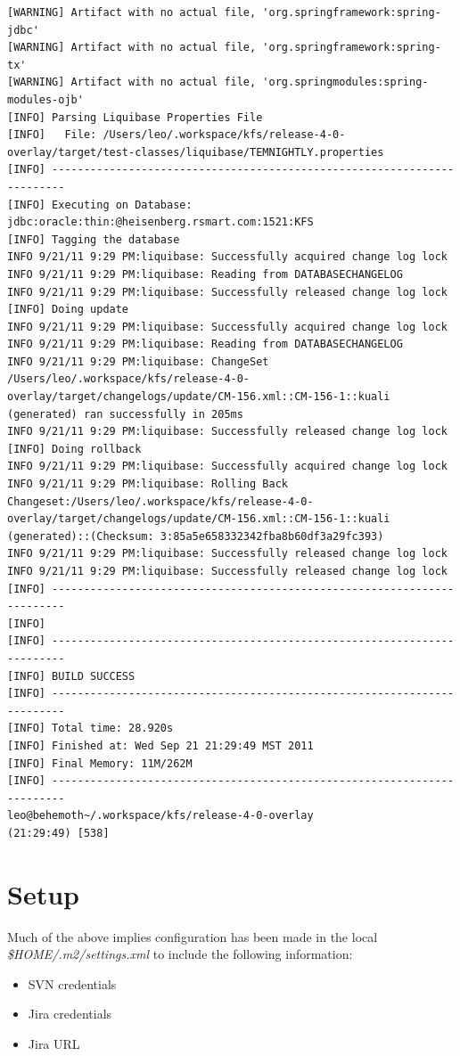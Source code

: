 \documentclass[12pt,notitlepage]{article}
\begin{document}
\begin{lstlisting}
[WARNING] Artifact with no actual file, 'org.springframework:spring-jdbc'
[WARNING] Artifact with no actual file, 'org.springframework:spring-tx'
[WARNING] Artifact with no actual file, 'org.springmodules:spring-modules-ojb'
[INFO] Parsing Liquibase Properties File
[INFO]   File: /Users/leo/.workspace/kfs/release-4-0-overlay/target/test-classes/liquibase/TEMNIGHTLY.properties
[INFO] ------------------------------------------------------------------------
[INFO] Executing on Database: jdbc:oracle:thin:@heisenberg.rsmart.com:1521:KFS
[INFO] Tagging the database
INFO 9/21/11 9:29 PM:liquibase: Successfully acquired change log lock
INFO 9/21/11 9:29 PM:liquibase: Reading from DATABASECHANGELOG
INFO 9/21/11 9:29 PM:liquibase: Successfully released change log lock
[INFO] Doing update
INFO 9/21/11 9:29 PM:liquibase: Successfully acquired change log lock
INFO 9/21/11 9:29 PM:liquibase: Reading from DATABASECHANGELOG
INFO 9/21/11 9:29 PM:liquibase: ChangeSet /Users/leo/.workspace/kfs/release-4-0-overlay/target/changelogs/update/CM-156.xml::CM-156-1::kuali (generated) ran successfully in 205ms
INFO 9/21/11 9:29 PM:liquibase: Successfully released change log lock
[INFO] Doing rollback
INFO 9/21/11 9:29 PM:liquibase: Successfully acquired change log lock
INFO 9/21/11 9:29 PM:liquibase: Rolling Back Changeset:/Users/leo/.workspace/kfs/release-4-0-overlay/target/changelogs/update/CM-156.xml::CM-156-1::kuali (generated)::(Checksum: 3:85a5e658332342fba8b60df3a29fc393)
INFO 9/21/11 9:29 PM:liquibase: Successfully released change log lock
INFO 9/21/11 9:29 PM:liquibase: Successfully released change log lock
[INFO] ------------------------------------------------------------------------
[INFO]
[INFO] ------------------------------------------------------------------------
[INFO] BUILD SUCCESS
[INFO] ------------------------------------------------------------------------
[INFO] Total time: 28.920s
[INFO] Finished at: Wed Sep 21 21:29:49 MST 2011
[INFO] Final Memory: 11M/262M
[INFO] ------------------------------------------------------------------------
leo@behemoth~/.workspace/kfs/release-4-0-overlay
(21:29:49) [538]
\end{lstlisting}


\section{Setup}

Much of the above implies configuration has been made in the local
\emph{\$HOME/.m2/settings.xml} to include the following information:
\begin{itemize}
\item SVN credentials
\item Jira credentials
\item Jira URL
\end{itemize}
\end{document}
